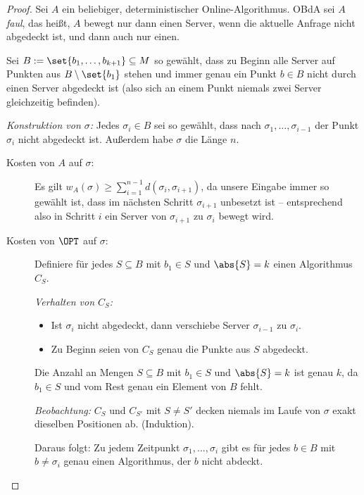 \documentclass[language=ngerman,algolist]{TemplateLecture}
\begin{document}
\begin{proof}
    Sei $A$ ein beliebiger, deterministischer Online-Algorithmus. OBdA sei $A$ \emph{faul}, das heißt, $A$ bewegt nur dann einen Server, wenn die aktuelle Anfrage nicht abgedeckt ist, und dann auch nur einen.

    Sei $B := \set{b_1, \ldots, b_{k+1}} \subseteq M$ so gewählt, dass zu Beginn alle Server auf Punkten aus $B \setminus \set{b_1}$ stehen und immer genau ein Punkt $b \in B$ nicht durch einen Server abgedeckt ist (also sich an einem Punkt niemals zwei Server gleichzeitig befinden).

    \emph{Konstruktion von $\sigma$:} Jedes $\sigma_i \in B$ sei so gewählt, dass nach $\sigma_1, \ldots, \sigma_{i-1}$ der Punkt $\sigma_i$ nicht abgedeckt ist. Außerdem habe $\sigma$ die Länge $n$.

    \begin{description}
        \item[Kosten von $A$ auf $\sigma$:] Es gilt $w_A(\sigma) \geq \sum_{i = 1}^{n-1} d(\sigma_i, \sigma_{i+1})$, da unsere Eingabe immer so gewählt ist, dass im nächsten Schritt $\sigma_{i+1}$ unbesetzt ist -- entsprechend also in Schritt $i$ ein Server von $\sigma_{i+1}$ zu $\sigma_i$ bewegt wird.
        \item[Kosten von $\OPT$ auf $\sigma$:] Definiere für jedes $S \subseteq B$ mit $b_1 \in S$ und $\abs{S} = k$ einen Algorithmus $C_S$.
        
        \emph{Verhalten von $C_S$:}
        \begin{itemize}
            \item Ist $\sigma_i$ nicht abgedeckt, dann verschiebe Server $\sigma_{i-1}$ zu $\sigma_i$.
            \item Zu Beginn seien von $C_S$ genau die Punkte aus $S$ abgedeckt.
        \end{itemize}
        Die Anzahl an Mengen $S \subseteq B$ mit $b_1 \in S$ und $\abs{S} = k$ ist genau $k$, da $b_1 \in S$ und vom Rest genau ein Element von $B$ fehlt.

        \emph{Beobachtung:} $C_S$ und $C_{S'}$ mit $S \neq S'$ decken niemals im Laufe von $\sigma$ exakt dieselben Positionen ab. (Induktion).

        Daraus folgt: Zu jedem Zeitpunkt $\sigma_1, \ldots, \sigma_i$ gibt es für jedes $b \in B$ mit $b \neq \sigma_i$ genau einen Algorithmus, der $b$ nicht abdeckt.


\end{description}
\end{proof}
\end{document}

